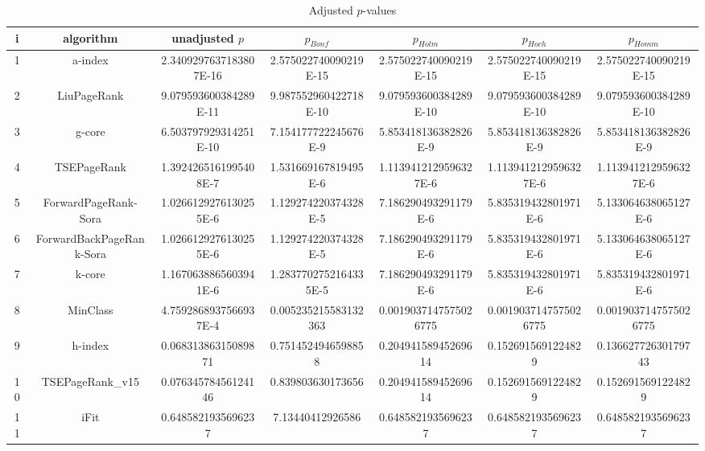 \documentclass[a4paper,10pt]{article}
\begin{document}
\begin{landscape}
\begin{table}[!htp]
\centering\tiny
\caption{Adjusted $p$-values}
\begin{tabular}{ccccccc}
i&algorithm&unadjusted $p$&$p_{Bonf}$&$p_{Holm}$&$p_{Hoch}$&$p_{Homm}$\\
\hline
1&a-index&2.3409297637183807E-16&2.575022740090219E-15&2.575022740090219E-15&2.575022740090219E-15&2.575022740090219E-15\\
2&LiuPageRank&9.079593600384289E-11&9.987552960422718E-10&9.079593600384289E-10&9.079593600384289E-10&9.079593600384289E-10\\
3&g-core&6.503797929314251E-10&7.154177722245676E-9&5.853418136382826E-9&5.853418136382826E-9&5.853418136382826E-9\\
4&TSEPageRank&1.3924265161995408E-7&1.531669167819495E-6&1.1139412129596327E-6&1.1139412129596327E-6&1.1139412129596327E-6\\
5&ForwardPageRank-Sora&1.0266129276130255E-6&1.129274220374328E-5&7.186290493291179E-6&5.835319432801971E-6&5.133064638065127E-6\\
6&ForwardBackPageRank-Sora&1.0266129276130255E-6&1.129274220374328E-5&7.186290493291179E-6&5.835319432801971E-6&5.133064638065127E-6\\
7&k-core&1.1670638865603941E-6&1.2837702752164335E-5&7.186290493291179E-6&5.835319432801971E-6&5.835319432801971E-6\\
8&MinClass&4.7592868937566937E-4&0.005235215583132363&0.0019037147575026775&0.0019037147575026775&0.0019037147575026775\\
9&h-index&0.06831386315089871&0.7514524946598858&0.20494158945269614&0.1526915691224829&0.13662772630179743\\
10&TSEPageRank_v15&0.07634578456124146&0.839803630173656&0.20494158945269614&0.1526915691224829&0.1526915691224829\\
11&iFit&0.6485821935696237&7.13440412926586&0.6485821935696237&0.6485821935696237&0.6485821935696237\\
\hline
\end{tabular}
\end{table}


\end{landscape}
\end{document}
